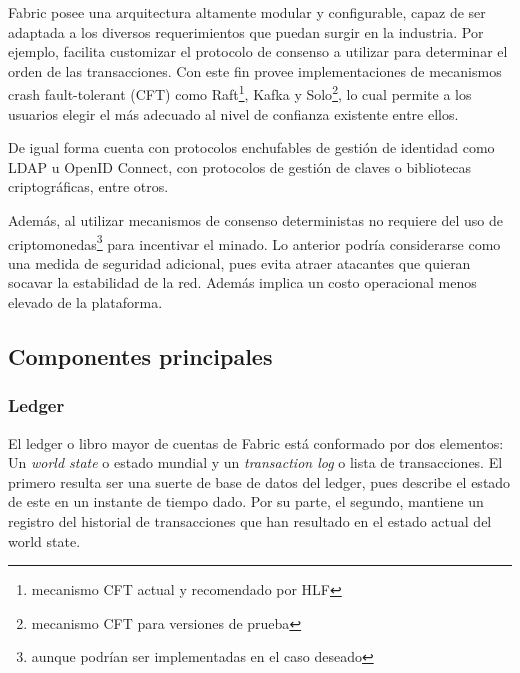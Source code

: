 Fabric posee una arquitectura altamente modular y configurable, capaz de ser adaptada a los diversos requerimientos que puedan surgir en la industria. Por ejemplo, facilita customizar el protocolo de consenso a utilizar para determinar el orden de las transacciones. Con este fin provee implementaciones de mecanismos crash fault-tolerant (CFT) como Raft\footnote{mecanismo CFT actual y recomendado por HLF}, Kafka y Solo\footnote{mecanismo CFT para versiones de prueba}, lo cual permite a los usuarios elegir el m\'as adecuado al nivel de confianza existente entre ellos.

De igual forma cuenta con protocolos enchufables de gesti\'on de identidad como LDAP u OpenID Connect, con protocolos de gesti\'on de claves o bibliotecas criptogr\'aficas, entre otros.



Adem\'as, al utilizar mecanismos de consenso deterministas no requiere del uso de criptomonedas\footnote{aunque podr\'ian ser implementadas en el caso deseado} para incentivar el minado. Lo anterior podr\'ia considerarse como una medida de seguridad adicional, pues evita atraer atacantes que quieran socavar la estabilidad de la red. Adem\'as implica un costo operacional menos elevado de la plataforma.

\subsection{Componentes principales}

\subsubsection{Ledger}
El ledger o libro mayor de cuentas de Fabric est\'a conformado por dos elementos: Un \emph{world state} o estado mundial y un \emph{transaction log} o lista de transacciones. El primero resulta ser una suerte de base de datos del ledger, pues describe el estado de este en un instante de tiempo dado. Por su parte, el segundo, mantiene un registro del historial de transacciones que han resultado en el estado actual del world state.

